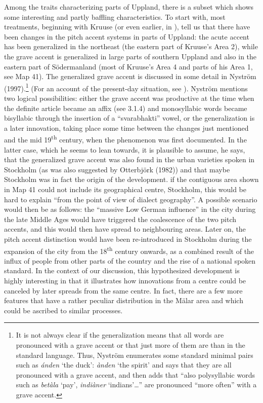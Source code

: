 Among the traits characterizing parts of Uppland, there is a subset which shows some interesting and partly baffling characteristics. To start with, most treatments, beginning with Kruuse (or even earlier, in \citet{Rydqvist1868}), tell us that there have been changes in the pitch accent systems in parts of Uppland: the acute accent has been generalized in the northeast (the eastern part of Kruuse’s Area 2), while the grave accent is generalized in large parts of southern Uppland and also in the eastern part of Södermanland (most of Kruuse’s Area 4 and parts of his Area 1, see Map 41). The generalized grave accent is discussed in some detail in Nyström (1997).\footnote{ It is not always clear if the generalization means that all words are pronounced with a grave accent or that just more of them are than in the standard language. Thus, Nyström enumerates some standard minimal pairs such as \textit{ánden} ‘the duck’: \textit{ànden} ‘the spirit’ and says that they are all pronounced with a grave accent, and then adds that “also polysyllabic words such as \textit{betàla} ‘pay’, \textit{indiàner} ‘indians’…” are pronounced “more often” with a grave accent. } (For an account of the present-day situation, see \citet{Ericsson2006}). Nyström mentions two logical possibilities: either the grave accent was productive at the time when the definite article became an affix (see 3.1.4) and monosyllabic words became bisyllabic through the insertion of a “svarabhakti” vowel, or the generalization is a later innovation, taking place some time between the changes just mentioned and the mid 19\textsuperscript{th} century, when the phenomenon was first documented. In the latter case, which he seems to lean towards, it is plausible to assume, he says, that the generalized grave accent was also found in the urban varieties spoken in Stockholm (as was also suggested by Otterbjörk (1982)) and that maybe Stockholm was in fact the origin of the development. if the contiguous area shown in Map 41 could not include its geographical centre, Stockholm, this would be hard to explain “from the point of view of dialect geography”. A possible scenario would then be as follows: the “massive Low German influence” in the city during the late Middle Ages would have triggered the coalescence of the two pitch accents, and this would then have spread to neighbouring areas. Later on, the pitch accent distinction would have been re-introduced in Stockholm during the expansion of the city from the 18\textsuperscript{th} century onwards, as a combined result of the influx of people from other parts of the country and the rise of a national spoken standard. In the context of our discussion, this hypothesized development is highly interesting in that it illustrates how innovations from a centre could be canceled by later spreads from the same centre. In fact, there are a few more features that have a rather peculiar distribution in the Mälar area and which could be ascribed to similar processes. 




